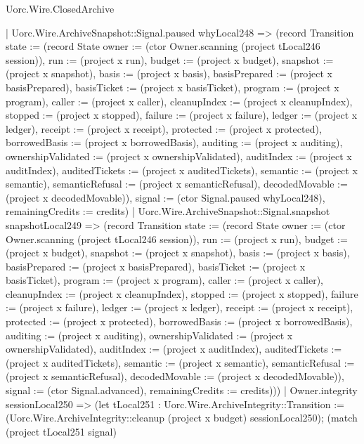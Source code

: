 \begin{lexlean}{Uorc.Wire.ClosedArchive}
\begin{semanticmodule}
{      | Uorc.Wire.ArchiveSnapshot::Signal.paused whyLocal248 => (record Transition {state := (record State {owner := (ctor Owner.scanning (project tLocal246 session)), run := (project x run), budget := (project x budget), snapshot := (project x snapshot), basis := (project x basis), basisPrepared := (project x basisPrepared), basisTicket := (project x basisTicket), program := (project x program), caller := (project x caller), cleanupIndex := (project x cleanupIndex), stopped := (project x stopped), failure := (project x failure), ledger := (project x ledger), receipt := (project x receipt), protected := (project x protected), borrowedBasis := (project x borrowedBasis), auditing := (project x auditing), ownershipValidated := (project x ownershipValidated), auditIndex := (project x auditIndex), auditedTickets := (project x auditedTickets), semantic := (project x semantic), semanticRefusal := (project x semanticRefusal), decodedMovable := (project x decodedMovable)}), signal := (ctor Signal.paused whyLocal248), remainingCredits := credits})
      | Uorc.Wire.ArchiveSnapshot::Signal.snapshot snapshotLocal249 => (record Transition {state := (record State {owner := (ctor Owner.scanning (project tLocal246 session)), run := (project x run), budget := (project x budget), snapshot := (project x snapshot), basis := (project x basis), basisPrepared := (project x basisPrepared), basisTicket := (project x basisTicket), program := (project x program), caller := (project x caller), cleanupIndex := (project x cleanupIndex), stopped := (project x stopped), failure := (project x failure), ledger := (project x ledger), receipt := (project x receipt), protected := (project x protected), borrowedBasis := (project x borrowedBasis), auditing := (project x auditing), ownershipValidated := (project x ownershipValidated), auditIndex := (project x auditIndex), auditedTickets := (project x auditedTickets), semantic := (project x semantic), semanticRefusal := (project x semanticRefusal), decodedMovable := (project x decodedMovable)}), signal := (ctor Signal.advanced), remainingCredits := credits})))
    | Owner.integrity sessionLocal250 => (let tLocal251 : Uorc.Wire.ArchiveIntegrity::Transition := (Uorc.Wire.ArchiveIntegrity::cleanup (project x budget) sessionLocal250); (match (project tLocal251 signal)
}
\end{semanticmodule}
\end{lexlean}
